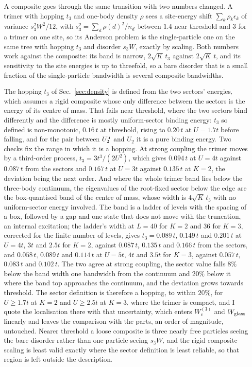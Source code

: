 \documentclass[aps,pre,twocolumn,superscriptaddress,floatfix]{revtex4-2}
\newcommand{\Up}{U_{2}}
\newcommand{\eps}{\epsilon}
\begin{document}
A composite goes through the same transition with two numbers changed.
A trimer with hopping $t_{3}$ and one-body density $\rho$ sees a
site-energy shift $\sum_{k}\rho_{k}\eps_{k}$ of variance
$s_{3}^{2}W^{2}/12$, with $s_{3}^{2}=\sum_{d}\rho(d)^{2}/n_{d}$ between
$1.4$ near threshold and $3$ for a trimer on one site, so its Anderson
problem is the single-particle one on the same tree with hopping $t_{3}$
and disorder $s_{3}W$, exactly by scaling. Both numbers work against the
composite: its band is narrow, $2\sqrt{K}\,t_{3}$ against
$2\sqrt{K}\,t$, and its sensitivity to the site energies is up to
threefold, so a bare disorder that is a small fraction of the
single-particle bandwidth is several composite bandwidths.

The hopping $t_{3}$ of Sec.~\ref{sec:density} is defined from the two
sectors' energies, which assumes a rigid composite whose only difference
between the sectors is the energy of its centre of mass. That fails near
threshold, where the two sectors bind differently and the difference is
mostly uniform-sector binding energy: $t_{3}$ so defined is
non-monotonic, $0.16\,t$ at threshold, rising to $0.20\,t$ at $U=1.7t$
before falling, and for the pair between $\Up^{\rm u}$ and $\Up$ it is a
pure binding energy. Two checks fix the range in which it is a hopping.
At strong coupling the trimer moves by a third-order process,
$t_{3}=3t^{3}/(2U^{2})$, which gives $0.094\,t$ at $U=4t$ against
$0.087\,t$ from the sectors and $0.167\,t$ at $U=3t$ against $0.135\,t$
at $K=2$, the deviation being the next order. And where the whole trimer
band lies below the three-body continuum, the eigenvalues of the
root-fixed sector below the edge are the box-quantised band of the
centre of mass, whose width is $4\sqrt{K}\,t_{3}$ with no uniform-sector
energy involved. The band is a ladder of levels with the spacing of a
box, followed by a gap and one state that does not move with the
truncation, an internal excitation; the ladder's width at $L=40$ for
$K=2$ and $36$ for $K=3$, corrected for the finite number of levels,
gives $t_{3}=0.089\,t$, $0.149\,t$ and $0.201\,t$ at $U=4t$, $3t$ and
$2.5t$ for $K=2$, against $0.087\,t$, $0.135\,t$ and $0.166\,t$ from the
sectors, and $0.058\,t$, $0.089\,t$ and $0.114\,t$ at $U=5t$, $4t$ and
$3.5t$ for $K=3$, against $0.057\,t$, $0.083\,t$ and $0.102\,t$. The two
agree at strong coupling, the sector value falls $8\%$ below the band
width one bandwidth from the continuum and $20\%$ below it where the
band top approaches the continuum, and the deviation grows towards
threshold. The sector definition is therefore a hopping, to within
$20\%$, for $U\ge1.7t$ at $K=2$ and $U\ge2.5t$ at $K=3$, where the
trimer is compact, and I quote the localisation there with that
uncertainty, which enters $W_{c}^{(3)}$ and $W_{\rm glass}$ linearly
and leaves the comparison with the parts, an order of magnitude,
untouched. Nearer threshold a loose
composite is three nearly free particles seeing the bare disorder
rather than one particle seeing $s_{3}W$, and the rigid-composite
scaling is least valid exactly where the sector definition is least
reliable, so that region is left outside the description.
\end{document}
